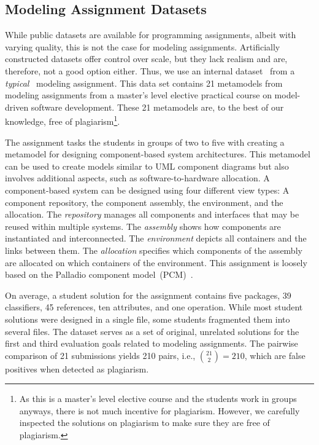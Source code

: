 \subsection{Modeling Assignment Datasets}\label{sec:datasets-mde}
While public datasets are available for programming assignments, albeit with varying quality, this is not the case for modeling assignments.
Artificially constructed datasets offer control over scale, but they lack realism and are, therefore, not a good option either.
Thus, we use an internal dataset~\cite{Saglam2022} from a \textit{typical}~\cite{Ciccozzi2018} modeling assignment.
This data set contains 21 metamodels from modeling assignments from a master's level elective practical course on model-driven software development.
These 21 metamodels are, to the best of our knowledge, free of plagiarism\footnote{As this is a master's level elective course and the students work in groups anyways, there is not much incentive for plagiarism. However, we carefully inspected the solutions on plagiarism to make sure they are free of plagiarism.}.

The assignment tasks the students in groups of two to five with creating a metamodel for designing component-based system architectures. This metamodel can be used to create models similar to \ac{UML} component diagrams but also involves additional aspects, such as software-to-hardware allocation.
A component-based system can be designed using four different view types: A component repository, the component assembly, the environment, and the allocation.
The \textit{repository} manages all components and interfaces that may be reused within multiple systems. The \textit{assembly} shows how components are instantiated and interconnected. The \textit{environment} depicts all containers and the links between them. The \textit{allocation} specifies which components of the assembly are allocated on which containers of the environment.
This assignment is loosely based on the Palladio component model~(PCM)~\cite{reussner2016a, becker2008a}.

On average, a student solution for the assignment contains five packages, 39 classifiers, 45 references, ten attributes, and one operation.
While most student solutions were designed in a single file, some students fragmented them into several files.
%
The dataset serves as a set of original, unrelated solutions for the first and third evaluation goals related to modeling assignments. 
The pairwise comparison of 21 submissions yields 210 pairs, i.e., $\binom{21}{2}=210$, which are false positives when detected as plagiarism.




